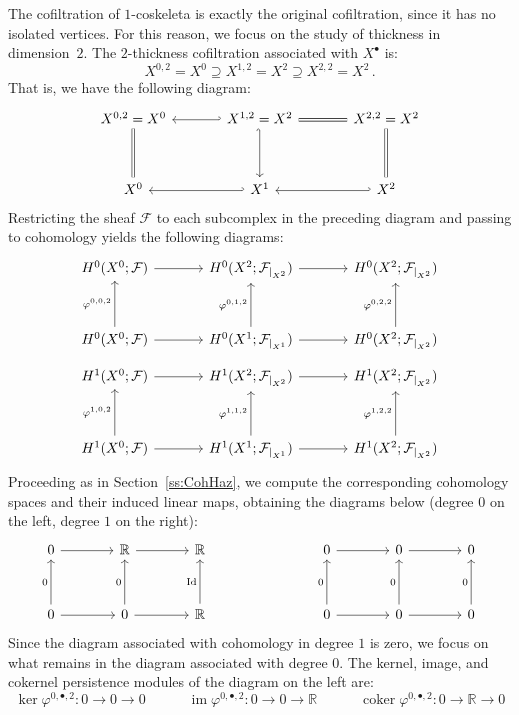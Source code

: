 \documentclass[reqno,12pt]{amsart}
\newcommand{\R}{\mathbb{R}}
\newcommand{\cF}{{\mathcal F}}
\DeclareMathOperator{\img}{im}
\DeclareMathOperator{\coker}{coker}
\newcommand{\0}{\mathbf 0}
\theoremstyle{definition}
\begin{document}
The cofiltration of $1$-coskeleta is exactly the original cofiltration, since it has no isolated vertices. For this reason, we focus on the study of thickness in dimension~$2$. The $2$-thickness cofiltration associated with $X^\bullet$ is:
\[
X^{0,2}=X^0\supseteq X^{1,2}=X^2\supseteq X^{2,2}=X^2\,.
\]
That is, we have the following diagram:
\[
\begin{tikzcd}[column sep=3.5em, row sep=3.5em]
X^{0,2}=X^0 & X^{1,2}=X^2\arrow[d, hook'] \arrow[l, hook'] & X^{2,2}=X^2 \arrow[l, equals] \\
X^0 \arrow[u, equals] & X^1 \arrow[l, hook']  & X^2 \arrow[l, hook'] \arrow[u, equals]
\end{tikzcd}
\]
Restricting the sheaf $\cF$ to each subcomplex in the preceding diagram and passing to cohomology yields the following diagrams:
\[
\begin{tikzcd}[column sep=3.5em, row sep=3.2em]
H^0(X^0;\mathcal F) \arrow[r] &
H^0(X^2;\mathcal F_{|_{X^2}}) \arrow[r] &
H^0(X^2;\mathcal F_{|_{X^2}}) \\
H^0(X^0;\mathcal F) \arrow[u, "\varphi^{0,0,2}"] \arrow[r] &
H^0(X^1;\mathcal F_{|_{X^1}}) \arrow[u, "\varphi^{0,1,2}"] \arrow[r] &
H^0(X^2;\mathcal F_{|_{X^2}}) \arrow[u, "\varphi^{0,2,2}"]
\end{tikzcd}
\]
\[
\begin{tikzcd}[column sep=3.5em, row sep=3.2em]
H^1(X^0;\mathcal F) \arrow[r] &
H^1(X^2;\mathcal F_{|_{X^2}}) \arrow[r] &
H^1(X^2;\mathcal F_{|_{X^2}}) \\
H^1(X^0;\mathcal F) \arrow[u, "\varphi^{1,0,2}"] \arrow[r] &
H^1(X^1;\mathcal F_{|_{X^1}}) \arrow[u, "\varphi^{1,1,2}"] \arrow[r] &
H^1(X^2;\mathcal F_{|_{X^2}}) \arrow[u, "\varphi^{1,2,2}"]
\end{tikzcd}
\]
Proceeding as in Section~\ref{ss:CohHaz}, we compute the corresponding cohomology spaces and their induced linear maps, obtaining the diagrams below (degree $0$ on the left, degree $1$ on the right): 
\begin{equation}\label{e:resgro}
\begin{tikzcd}[column sep=3.8em, row sep=3.2em]
0 \arrow[r] &
\mathbb R \arrow[r] &
\mathbb R
&&
0 \arrow[r] &
0 \arrow[r] &
0
\\
0 \arrow[u, "0"] \arrow[r] &
0 \arrow[u, "0"] \arrow[r] &
\mathbb R \arrow[u, "\mathrm{Id}"]
&&
0 \arrow[u, "0"] \arrow[r] &
0 \arrow[u, "0"] \arrow[r] &
0 \arrow[u, "0"]
\end{tikzcd}
\end{equation}
Since the diagram associated with cohomology in degree $1$ is zero, we focus on what remains in the diagram associated with degree $0$. The kernel, image, and cokernel persistence modules of the diagram on the left are:
\[
\ker \varphi^{0,\bullet,2} \colon 0\longrightarrow 0\longrightarrow 0 \qquad \quad \img \varphi^{0,\bullet,2} \colon 0\longrightarrow 0\longrightarrow \mathbb R \qquad \quad \coker \varphi^{0,\bullet,2} \colon 0\longrightarrow \R \longrightarrow 0
\]
\end{document}
